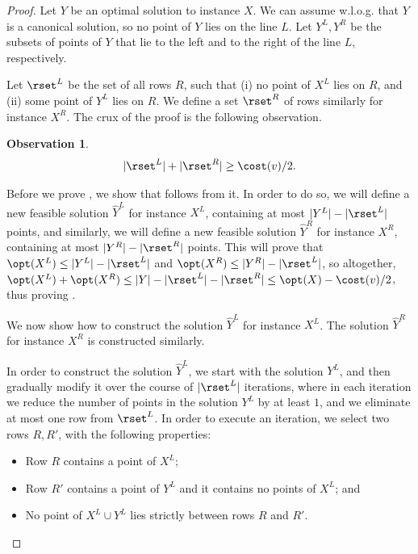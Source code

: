 \documentclass{toc}
\newtheorem{myobs}[theorem]{Observation}
\begin{document}
\begin{proof}{}
	Let $Y$ be an optimal solution to instance $X$. We can assume w.l.o.g. that $Y$ is a canonical solution, so no point of $Y$ lies on the line $L$. Let $Y^L,Y^R$ be the subsets of points of $Y$ that lie to the left and to the right of the line $L$, respectively.
	
Let $\rset^L$ be the set of all rows $R$, such that (i) no point of $X^L$ lies on $R$, and (ii) some point of $Y^L$ lies on $R$. We define a set $\rset^R$ of rows similarly for instance $X^R$. The crux of the proof is the following observation.

\begin{myobs}\label{obs number of inactive rows with points}
\[	|\rset^L|+|\rset^R|\geq \cost(v)/2.\]
\end{myobs}

Before we	prove , we show that  follows from it. In order to do so, we will define a new feasible solution $\hat Y^L$ for instance $X^L$, containing at most $|Y^L|-|\rset^L|$ points, and similarly, we will define a new feasible solution $\hat Y^R$ for instance $X^R$, containing at most $|Y^R|-|\rset^R|$ points. This will prove that $\opt(X^L)\leq |Y^L|-|\rset^L|$ and $\opt(X^R)\leq |Y^R|-|\rset^L|$, so altogether, $\opt(X^L)+\opt(X^R) \leq |Y|-|\rset^L|-|\rset^R|\leq \opt(X)-\cost(v)/2$, thus proving .

We now show how to construct the solution $\hat Y^L$ for instance $X^L$. The solution $\hat Y^R$ for instance $X^R$ is constructed similarly.

In order to construct the solution $\hat Y^L$, we start with the solution $Y^L$, and then gradually modify it over the course of $|\rset^L|$ iterations, where in each iteration we reduce the number of points in the solution $Y^L$ by at least $1$, and we eliminate at most one row from $\rset^L$. In order to execute an iteration, we select two rows $R,R'$, with the following properties:

\begin{itemize}
	\item Row $R$ contains a point of $X^L$;
	\item Row $R'$ contains a point of $Y^L$ and it contains no points of $X^L$; and
	\item No point of $X^L\cup Y^L$ lies strictly between  rows $R$ and $R'$.
\end{itemize}


\end{proof}
\end{document}
